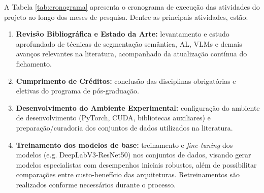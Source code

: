 A Tabela \ref{tab:cronograma} apresenta o cronograma de execução das atividades do projeto ao longo dos meses de pesquisa. Dentre as principais atividades, estão:

\begin{enumerate}

\item \textbf{Revisão Bibliográfica e Estado da Arte:} levantamento e estudo aprofundado de técnicas de segmentação semântica, \ac{AL}, \ac{VLM}s e demais avanços relevantes na literatura, acompanhado da atualização contínua do fichamento.


\item \textbf{Cumprimento de Créditos:} conclusão das disciplinas obrigatórias e eletivas do programa de pós-graduação.

\item \textbf{Desenvolvimento do Ambiente Experimental:} configuração do ambiente de desenvolvimento (PyTorch, CUDA, bibliotecas auxiliares) e preparação/curadoria dos conjuntos de dados utilizados na literatura.


\item \begin{sloppypar}\textbf{Treinamento dos modelos de base:} treinamento e \textit{fine-tuning} dos modelos (e.g. DeepLabV3-ResNet50) nos conjuntos de dados, %
visando gerar modelos especialistas %
com desempenhos iniciais robustos, além de possibilitar comparações entre custo-benefício das arquiteturas. Retreinamentos são realizados conforme necessários durante o processo.\end{sloppypar}



\end{enumerate}
